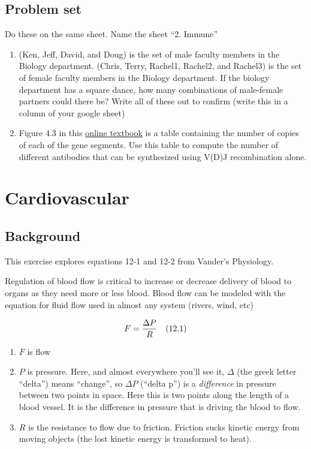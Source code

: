 \documentclass[]{book}
\providecommand{\tightlist}{%
  \setlength{\itemsep}{0pt}\setlength{\parskip}{0pt}}
\begin{document}
\section{Problem set}\label{problem-set-1}

Do these on the same sheet. Name the sheet ``2. Immune''

\begin{enumerate}
\def\labelenumi{\arabic{enumi}.}
\item
  (Ken, Jeff, David, and Doug) is the set of male faculty members in the
  Biology department. (Chris, Terry, Rachel1, Rachel2, and Rachel3) is
  the set of female faculty members in the Biology department. If the
  biology department has a square dance, how many combinations of
  male-female partners could there be? Write all of these out to confirm
  (write this in a column of your google sheet)
\item
  Figure 4.3 in this
  \href{https://www.ncbi.nlm.nih.gov/books/NBK27140/}{online textbook}
  is a table containing the number of copies of each of the gene
  segments. Use this table to compute the number of different antibodies
  that can be synthesized using V(D)J recombination alone.
\end{enumerate}

\chapter{Cardiovascular}\label{cardiovascular}

\section{Background}\label{background}

This exercise explores equations 12-1 and 12-2 from Vander's Physiology.

Regulation of blood flow is critical to increase or decrease delivery of
blood to organs as they need more or less blood. Blood flow can be
modeled with the equation for fluid flow used in almost any system
(rivers, wind, etc)

\begin{equation}
F = \frac{\Delta P}{R} \quad \small{(12.1)}
\end{equation}

\begin{enumerate}
\def\labelenumi{\arabic{enumi}.}
\tightlist
\item
  \(F\) is flow
\item
  \(P\) is pressure. Here, and almost everywhere you'll see it,
  \(\Delta\) (the greek letter ``delta'') means ``change'', so
  \(\Delta P\) (``delta p'') is a \emph{difference} in pressure between
  two points in space. Here this is two points along the length of a
  blood vessel. It is the difference in pressure that is driving the
  blood to flow.
\item
  \(R\) is the resistance to flow due to friction. Friction sucks
  kinetic energy from moving objects (the lost kinetic energy is
  transformed to heat).
\end{enumerate}
\end{document}
